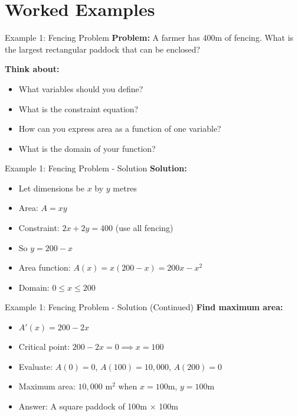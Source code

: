 \documentclass[aspectratio=169]{beamer}
\begin{document}
\section{Worked Examples}

\begin{frame}{Example 1: Fencing Problem}
\textbf{Problem:} A farmer has 400m of fencing. What is the largest rectangular paddock that can be enclosed?

\textbf{Think about:}
\begin{itemize}
    \item What variables should you define?
    \item What is the constraint equation?
    \item How can you express area as a function of one variable?
    \item What is the domain of your function?
\end{itemize}
\end{frame}

\begin{frame}{Example 1: Fencing Problem - Solution}
\textbf{Solution:}
\begin{itemize}
    \item Let dimensions be $x$ by $y$ metres
    \item Area: $A = xy$
    \item Constraint: $2x + 2y = 400$ (use all fencing)
    \item So $y = 200 - x$
    \item Area function: $A(x) = x(200-x) = 200x - x^2$
    \item Domain: $0 \leq x \leq 200$
\end{itemize}
\end{frame}

\begin{frame}{Example 1: Fencing Problem - Solution (Continued)}
\textbf{Find maximum area:}
\begin{itemize}
    \item $A'(x) = 200 - 2x$
    \item Critical point: $200 - 2x = 0 \implies x = 100$
    \item Evaluate: $A(0) = 0$, $A(100) = 10,000$, $A(200) = 0$
    \item Maximum area: $10,000$ m$^2$ when $x = 100$m, $y = 100$m
    \item Answer: A square paddock of 100m × 100m
\end{itemize}
\end{frame}
\end{document}
